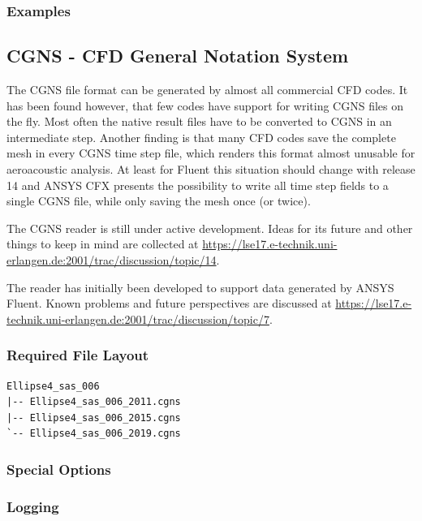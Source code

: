 \documentclass[a4paper,10pt]{article}
\begin{document}
\subsubsection{Examples}


\newpage
\subsection{CGNS - CFD General Notation System}
\label{sec:cgns}

The CGNS file  format can be generated by almost all  commercial CFD codes. It
has been found however, that few  codes have support for writing CGNS files on
the fly. Most often the native result files have to be converted to CGNS in an
intermediate step.  Another  finding is that many CFD  codes save the complete
mesh in every  CGNS time step file, which renders  this format almost unusable
for aeroacoustic  analysis. At least  for Fluent this situation  should change
with release 14 and ANSYS CFX  presents the possibility to write all time step
fields to a single CGNS file, while only saving the mesh once (or twice).

The CGNS  reader is still under  active development. Ideas for  its future and
other     things     to     keep      in     mind     are     collected     at
\url{https://lse17.e-technik.uni-erlangen.de:2001/trac/discussion/topic/14}.

The reader  has initially  been developed to  support data generated  by ANSYS
Fluent.   Known   problems   and   future  perspectives   are   discussed   at
\url{https://lse17.e-technik.uni-erlangen.de:2001/trac/discussion/topic/7}.


\subsubsection{Required File Layout}

\begin{verbatim}
Ellipse4_sas_006
|-- Ellipse4_sas_006_2011.cgns
|-- Ellipse4_sas_006_2015.cgns
`-- Ellipse4_sas_006_2019.cgns
\end{verbatim}

\subsubsection{Special Options}

\subsubsection{Logging} 
\end{document}
